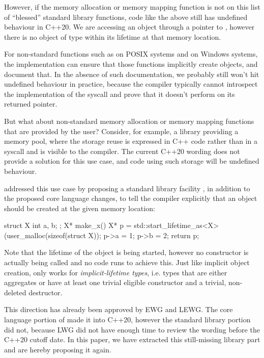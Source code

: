 However, if the memory allocation or memory mapping function is not on this list of ``blessed'' standard library functions, code like the above still has undefined behaviour in C++20. We are accessing an object through a pointer to , however there is no object of type  within its lifetime at that memory location.

For non-standard functions such as  on POSIX systems and  on Windows systems, the implementation can ensure that those functions implicitly create objects, and document that. In the absence of such documentation, we probably still won't hit undefined behaviour in practice, because the compiler typically cannot introspect the implementation of the syscall and prove that it doesn't perform  on its returned pointer.

But what about non-standard memory allocation or memory mapping functions that are provided by the user? Consider, for example, a library providing a memory pool, where the storage reuse is expressed in C++ code rather than in a syscall and is visible to the compiler. The current C++20 wording does not provide a solution for this use case, and code using such storage will be undefined behaviour.

\cite{P0593R6} addressed this use case by proposing a standard library facility \mbox{}, in addition to the proposed core language changes, to tell the compiler explicitly that an object should be created at the given memory location:

\begin{codeblock}
struct X { int a, b; };
X* make_x() {
  X* p = std::start_lifetime_as<X>(user_malloc(sizeof(struct X));
  p->a = 1;
  p->b = 2;
  return p;
}
\end{codeblock}

Note that the lifetime of the object is being started, however no constructor is actually being called and no code runs to achieve this. Just like implicit object creation,  only works for \emph{implicit-lifetime types}, i.e. types that are either aggregates or have at least one trivial eligible constructor and a trivial, non-deleted destructor.

This direction has already been approved by EWG and LEWG. The core language portion of \cite{P0593R6} made it into C++20, however the standard library portion did not, because LWG did not have enough time to review the wording before the C++20 cutoff date. In this paper, we have extracted this still-missing library part and are hereby proposing it again.

